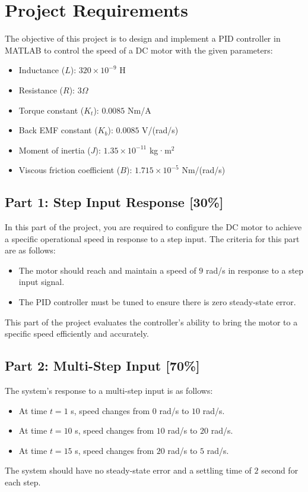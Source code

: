 \documentclass[11pt]{article}
\begin{document}
\section{Project Requirements}
The objective of this project is to design and implement a PID controller in MATLAB to control the speed of a DC motor with the given parameters:

\begin{itemize}
    \item Inductance (\(L\)): \(320 \times 10^{-9}\) H
    \item Resistance (\(R\)): \(3 \Omega\)
    \item Torque constant (\(K_t\)): \(0.0085\) Nm/A
    \item Back EMF constant (\(K_b\)): \(0.0085\) V/(rad/s)
    \item Moment of inertia (\(J\)): \(1.35 \times 10^{-11}\) kg·m\(^2\)
    \item Viscous friction coefficient (\(B\)): \(1.715 \times 10^{-5}\) Nm/(rad/s)
\end{itemize}

\subsection{Part 1: Step Input Response [30\%]}
In this part of the project, you are required to configure the DC motor to achieve a specific operational speed in response to a step input. The criteria for this part are as follows:
\begin{itemize}
    \item The motor should reach and maintain a speed of \(9\) rad/s in response to a step input signal.
    \item The PID controller must be tuned to ensure there is zero steady-state error.
\end{itemize}
This part of the project evaluates the controller's ability to bring the motor to a specific speed efficiently and accurately.

\subsection{Part 2: Multi-Step Input [70\%]}
The system's response to a multi-step input is as follows:
\begin{itemize}
    \item At time \(t=1\) s, speed changes from \(0\) rad/s to \(10\) rad/s.
    \item At time \(t=10\) s, speed changes from \(10\) rad/s to \(20\) rad/s.
    \item At time \(t=15\) s, speed changes from \(20\) rad/s to \(5\) rad/s.
\end{itemize}
The system should have no steady-state error and a settling time of \(2\) second for each step.
\end{document}
